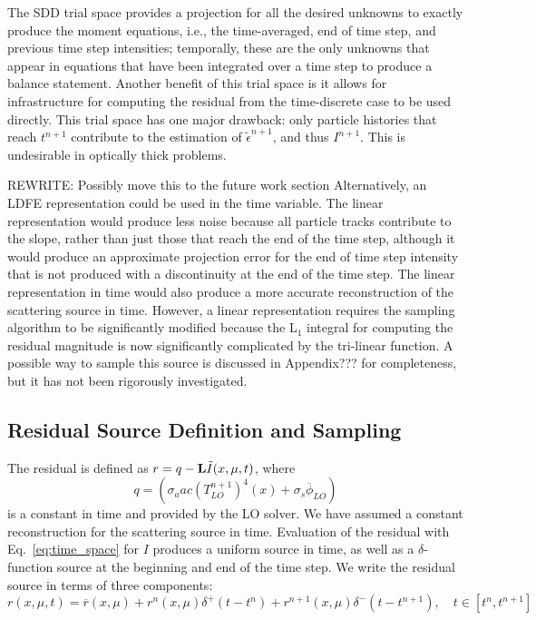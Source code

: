 The SDD trial space provides a projection for all the desired unknowns to exactly produce the moment
equations, i.e., the time-averaged, end of time step, and previous time step intensities;
temporally, these are the only unknowns that appear in equations that have
been integrated over a time step to produce a balance statement.  Another benefit of this
trial space is it allows for infrastructure for computing the residual from the
time-discrete case to be used directly.  This trial space has one major drawback:
only particle histories that reach $t^{n+1}$ contribute to the estimation of $\tilde
\epsilon^{n+1}$, and thus $I^{n+1}$.  This is undesirable in optically thick problems.

REWRITE: Possibly move this to the future work section
Alternatively, an LDFE representation could be used in the time
variable. The linear representation would produce less noise because all particle tracks
contribute to the slope, rather than just those that reach the end of the time step,
although it would produce an approximate projection error for the end of time step
intensity that is not produced with a discontinuity at the end of the time step.  The
linear representation in time would also produce a more accurate reconstruction of the
scattering source in time.  However, a linear representation requires the sampling
algorithm to be significantly modified because the L$_1$ integral for computing the
residual magnitude is now significantly complicated by the tri-linear function.  A
possible way to sample this source is discussed in Appendix??? for completeness, but it has
not been rigorously investigated.

\subsection{Residual Source Definition and Sampling}

The residual is defined as $r = q - \mathbf{L} \tilde I(x,\mu,t)$, where
\begin{equation}
    q=\left(\sigma_a a c (T_{LO}^{n+1})^4(x) + \sigma_s\overline\phi_{LO}\right)
\end{equation}
is a constant in time and provided by the LO solver. We have assumed a constant reconstruction for the scattering source
in time.
Evaluation of the residual with Eq.~\eqref{eq:time_space} for $I$ produces a uniform source in time, as well as a $\delta$-function source at the
beginning and end of the time step.  We write the residual source in terms of three components:
\begin{equation}
    r(x,\mu,t) = \overline r(x,\mu)  + r^{n}(x,\mu)\delta^+(t-t^{n}) +
    r^{n+1}(x,\mu)\delta^-(t - t^{n+1}),
    \quad t\in[t^{n},t^{n+1}]
\end{equation}

